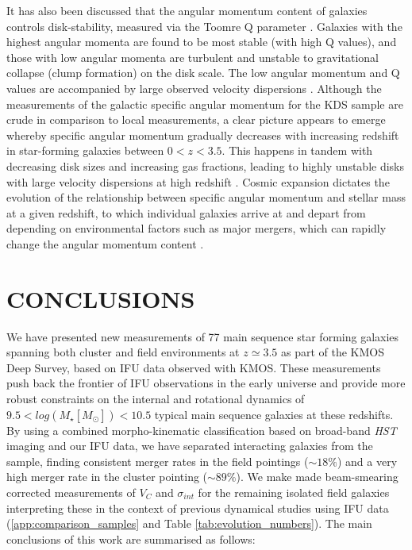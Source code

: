 \documentclass[fleqn,usenatbib]{mnras}
\begin{document}
It has also been discussed that the angular momentum content of galaxies controls disk-stability, measured via the Toomre Q parameter \citep[e.g.][]{Obreschkow2016,Swinbank2017}.
Galaxies with the highest angular momenta are found to be most stable (with high Q values), and those with low angular momenta are turbulent and unstable to gravitational collapse (clump formation) on the disk scale.
The low angular momentum and Q values are accompanied by large observed velocity dispersions \citep{Obreschkow2016}.
Although the measurements of the galactic specific angular momentum for the KDS sample are crude in comparison to local measurements, a clear picture appears to emerge whereby specific angular momentum gradually decreases with increasing redshift in star-forming galaxies between $0 < z < 3.5$.
This happens in tandem with decreasing disk sizes and increasing gas fractions, leading to highly unstable disks with large velocity dispersions at high redshift \citep[e.g.][]{ForsterSchreiber2009,Gnerucci2011,Wisnioski2015,Turner2017}.
Cosmic expansion dictates the evolution of the relationship between specific angular momentum and stellar mass at a given redshift, to which individual galaxies arrive at and depart from depending on environmental factors such as major mergers, which can rapidly change the angular momentum content \citep[e.g.][]{Genel2015,Obreschkow2016,Lagos2017}.  

\section{CONCLUSIONS}\label{sec:conclusion}
We have presented new measurements of 77 main sequence star forming galaxies spanning both cluster and field environments at $z\simeq3.5$ as part of the KMOS Deep Survey, based on IFU data observed with KMOS.
These measurements push back the frontier of IFU observations in the early universe and provide more robust constraints on the internal and rotational dynamics of $9.5 < log(M_{\star}[M_{\odot}])< 10.5$ typical main sequence galaxies at these redshifts.
By using a combined morpho-kinematic classification based on broad-band {\em HST} imaging and our IFU data, we have separated interacting galaxies from the sample, finding consistent merger rates in the field pointings ($\sim18\%$) and a very high merger rate in the cluster pointing ($\sim89\%$).
We make made beam-smearing corrected measurements of $V_{C}$ and $\sigma_{int}$ for the remaining isolated field galaxies interpreting these in the context of previous dynamical studies using IFU data (\cref{app:comparison_samples} and Table \ref{tab:evolution_numbers}).
The main conclusions of this work are summarised as follows:
\end{document}
